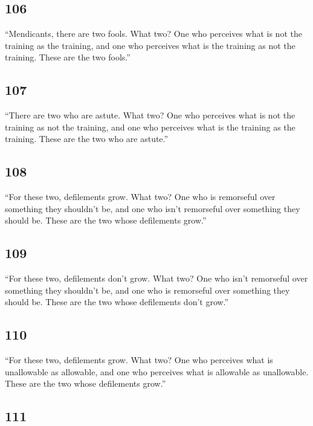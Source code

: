 \documentclass[12pt,openany]{book}%
\begin{document}
\subsection*{106 }

“Mendicants, there are two fools. What two? One who perceives what is not the training as the training, and one who perceives what is the training as not the training. These are the two fools.” 

\subsection*{107 }

“There are two who are astute. What two? One who perceives what is not the training as not the training, and one who perceives what is the training as the training. These are the two who are astute.” 

\subsection*{108 }

“For these two, defilements grow. What two? One who is remorseful over something they shouldn’t be, and one who isn’t remorseful over something they should be. These are the two whose defilements grow.” 

\subsection*{109 }

“For these two, defilements don’t grow. What two? One who isn’t remorseful over something they shouldn’t be, and one who is remorseful over something they should be. These are the two whose defilements don’t grow.” 

\subsection*{110 }

“For these two, defilements grow. What two? One who perceives what is unallowable as allowable, and one who perceives what is allowable as unallowable. These are the two whose defilements grow.” 

\subsection*{111 }
\end{document}
